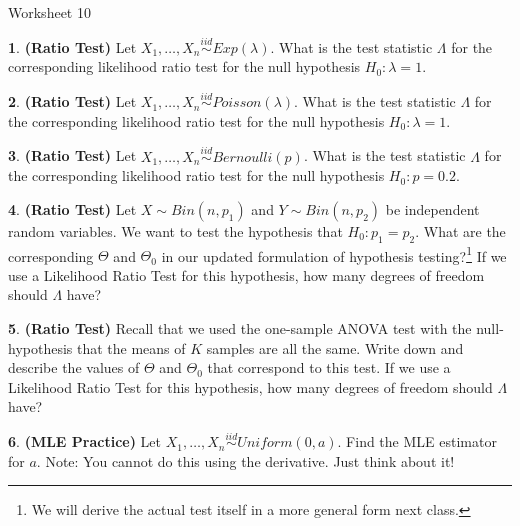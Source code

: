 \documentclass{tufte-handout}
\newcommand{\iid}{\stackrel{iid}{\sim}}
\begin{document}
\justify

{\LARGE Worksheet 10}

\vspace*{18pt}


\textbf{1}. \textbf{(Ratio Test)} Let $X_1, \ldots, X_n \iid Exp(\lambda)$.
What is the test statistic $\Lambda$ for the corresponding likelihood 
ratio test for the null hypothesis $H_0: \lambda = 1$.

\textbf{2}. \textbf{(Ratio Test)} Let $X_1, \ldots, X_n \iid Poisson(\lambda)$.
What is the test statistic $\Lambda$ for the corresponding likelihood 
ratio test for the null hypothesis $H_0: \lambda = 1$.

\textbf{3}. \textbf{(Ratio Test)} Let $X_1, \ldots, X_n \iid Bernoulli(p)$.
What is the test statistic $\Lambda$ for the corresponding likelihood 
ratio test for the null hypothesis $H_0: p = 0.2$.

\textbf{4}. \textbf{(Ratio Test)} Let $X \sim Bin(n, p_1)$ and $Y \sim Bin(n, p_2)$ be
independent random variables. We want to test the hypothesis that
$H_0: p_1 = p_2$. What are the corresponding $\Theta$ and $\Theta_0$ in
our updated formulation of hypothesis testing?\footnote{
  We will derive the actual test itself in a more general form next
  class.
} If we use a Likelihood Ratio Test for this hypothesis, how many degrees of
freedom should $\Lambda$ have?

\textbf{5}. \textbf{(Ratio Test)} Recall that we used the one-sample ANOVA test with the
null-hypothesis that the means of $K$ samples are all the same. Write down and
describe the values of $\Theta$ and $\Theta_0$ that correspond to this test. 
If we use a Likelihood Ratio Test for this hypothesis, how many degrees of
freedom should $\Lambda$ have?

\textbf{6}. \textbf{(MLE Practice)} Let $X_1, \ldots, X_n \iid Uniform(0, a)$. Find the MLE
estimator for $a$. Note: You cannot do this using the derivative. Just think about it!
\end{document}
